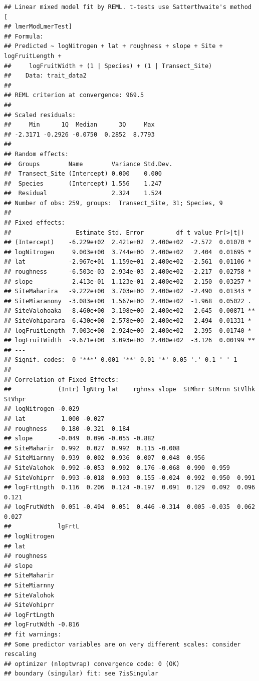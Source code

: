 \documentclass[
  12pt,
]{article}
\begin{document}
\begin{verbatim}
## Linear mixed model fit by REML. t-tests use Satterthwaite's method [
## lmerModLmerTest]
## Formula: 
## Predicted ~ logNitrogen + lat + roughness + slope + Site + logFruitLength +  
##     logFruitWidth + (1 | Species) + (1 | Transect_Site)
##    Data: trait_data2
## 
## REML criterion at convergence: 969.5
## 
## Scaled residuals: 
##     Min      1Q  Median      3Q     Max 
## -2.3171 -0.2926 -0.0750  0.2852  8.7793 
## 
## Random effects:
##  Groups        Name        Variance Std.Dev.
##  Transect_Site (Intercept) 0.000    0.000   
##  Species       (Intercept) 1.556    1.247   
##  Residual                  2.324    1.524   
## Number of obs: 259, groups:  Transect_Site, 31; Species, 9
## 
## Fixed effects:
##                  Estimate Std. Error         df t value Pr(>|t|)   
## (Intercept)    -6.229e+02  2.421e+02  2.400e+02  -2.572  0.01070 * 
## logNitrogen     9.003e+00  3.744e+00  2.400e+02   2.404  0.01695 * 
## lat            -2.967e+01  1.159e+01  2.400e+02  -2.561  0.01106 * 
## roughness      -6.503e-03  2.934e-03  2.400e+02  -2.217  0.02758 * 
## slope           2.413e-01  1.123e-01  2.400e+02   2.150  0.03257 * 
## SiteMaharira   -9.222e+00  3.703e+00  2.400e+02  -2.490  0.01343 * 
## SiteMiaranony  -3.083e+00  1.567e+00  2.400e+02  -1.968  0.05022 . 
## SiteValohoaka  -8.460e+00  3.198e+00  2.400e+02  -2.645  0.00871 **
## SiteVohiparara -6.430e+00  2.578e+00  2.400e+02  -2.494  0.01331 * 
## logFruitLength  7.003e+00  2.924e+00  2.400e+02   2.395  0.01740 * 
## logFruitWidth  -9.671e+00  3.093e+00  2.400e+02  -3.126  0.00199 **
## ---
## Signif. codes:  0 '***' 0.001 '**' 0.01 '*' 0.05 '.' 0.1 ' ' 1
## 
## Correlation of Fixed Effects:
##             (Intr) lgNtrg lat    rghnss slope  StMhrr StMrnn StVlhk StVhpr
## logNitrogen -0.029                                                        
## lat          1.000 -0.027                                                 
## roughness    0.180 -0.321  0.184                                          
## slope       -0.049  0.096 -0.055 -0.882                                   
## SiteMaharir  0.992  0.027  0.992  0.115 -0.008                            
## SiteMiarnny  0.939  0.002  0.936  0.007  0.048  0.956                     
## SiteValohok  0.992 -0.053  0.992  0.176 -0.068  0.990  0.959              
## SiteVohiprr  0.993 -0.018  0.993  0.155 -0.024  0.992  0.950  0.991       
## logFrtLngth  0.116  0.206  0.124 -0.197  0.091  0.129  0.092  0.096  0.121
## logFrutWdth  0.051 -0.494  0.051  0.446 -0.314  0.005 -0.035  0.062  0.027
##             lgFrtL
## logNitrogen       
## lat               
## roughness         
## slope             
## SiteMaharir       
## SiteMiarnny       
## SiteValohok       
## SiteVohiprr       
## logFrtLngth       
## logFrutWdth -0.816
## fit warnings:
## Some predictor variables are on very different scales: consider rescaling
## optimizer (nloptwrap) convergence code: 0 (OK)
## boundary (singular) fit: see ?isSingular
\end{verbatim}
\end{document}
